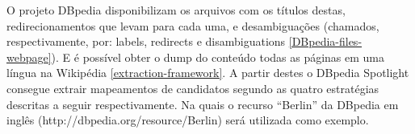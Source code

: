 \documentclass[10pt,a4paper]{llncs}
\begin{document}
O projeto DBpedia disponibilizam os arquivos com os títulos destas, redirecionamentos que levam para cada uma, e desambiguações (chamados, respectivamente, por: labels, redirects e disambiguations \ref{DBpedia-files-webpage}). E é possível obter o dump do conteúdo todas as páginas em uma língua na Wikipédia \ref{extraction-framework}. A partir destes o DBpedia Spotlight consegue extrair mapeamentos de candidatos segundo as quatro estratégias descritas a seguir respectivamente. %
Na quais o recurso ``Berlin'' da DBpedia em inglês (http://dbpedia.org/resource/Berlin) será utilizada como exemplo.
\end{document}
